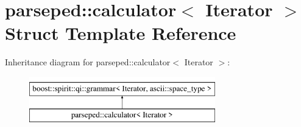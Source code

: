 \hypertarget{structparseped_1_1calculator}{}\section{parseped\+:\+:calculator$<$ Iterator $>$ Struct Template Reference}
\label{structparseped_1_1calculator}
Inheritance diagram for parseped\+:\+:calculator$<$ Iterator $>$\+:\begin{figure}[H]
\begin{center}
\leavevmode
\includegraphics[height=2.000000cm]{structparseped_1_1calculator}
\end{center}
\end{figure}

